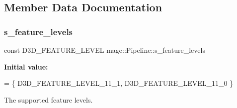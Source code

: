 \subsection{Member Data Documentation}
\hypertarget{structmage_1_1_pipeline_a2b8c39e47ee583beb55fa1a8741deb4a}{}\label{structmage_1_1_pipeline_a2b8c39e47ee583beb55fa1a8741deb4a} 
\subsubsection{\texorpdfstring{s\+\_\+feature\+\_\+levels}{s\_feature\_levels}}
{\footnotesize\ttfamily const D3\+D\+\_\+\+F\+E\+A\+T\+U\+R\+E\+\_\+\+L\+E\+V\+EL mage\+::\+Pipeline\+::s\+\_\+feature\+\_\+levels\hspace{0.3cm}{\ttfamily [static]}}

{\bfseries Initial value\+:}
\begin{DoxyCode}
= \{
        D3D\_FEATURE\_LEVEL\_11\_1,
        D3D\_FEATURE\_LEVEL\_11\_0
    \}
\end{DoxyCode}
The supported feature levels. 